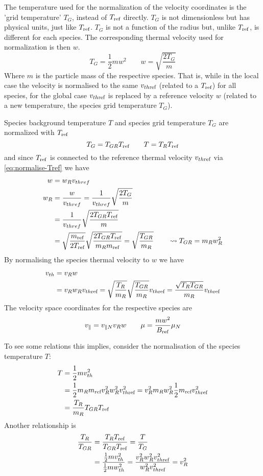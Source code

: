 The temperature used for the normalization of the velocity coordinates
is the 'grid temperature' $T_G$, instead of $T_{\text{ref}}$ directly. 
$T_G$ is not dimensionless but has physical units, just like $T_{\text{ref}}$. $T_G$ is
not a function of the radius but, unlike $T_{\rm ref}$, is different
for each species.  The corresponding thermal velocity used for normalization is then $w$.
\begin{equation}
T_G = \frac{1}{2} m w^2 \qquad w = \sqrt{\frac{2 T_G}{m} }
\end{equation}
Where $m$ is the particle mass of the respective species. 
That is, while in the local case the velocity is normalised to the same $v_{th\text{ref}}$ (related to a $T_{\text{ref}}$)
for all species, for the global case $v_{th\text{ref}}$ is replaced by a reference velocity $w$ (related to 
a new temperature, the species grid temperature $T_G$).

Species background temperature $T$ and species grid temperature $T_G$ are normalized with $T_{\rm ref}$
\begin{equation}
T_G = T_{GR} T_{\text{ref}} \qquad T = T_R T_{\text{ref}}
\end{equation}
and since $T_{\rm ref}$ is connected to the reference thermal velocity $v_{th\text{ref}}$ via \eqref{eq:normalise-Tref} we have 
\begin{align}
w &= w_R v_{thref} \\
w_R &= \frac{w}{v_{thref}} 
=\frac{1}{v_{thref}} \sqrt{\frac{2T_G}{m}}
\nonumber\\
&=\frac{1}{v_{thref}} \sqrt{\frac{2T_{GR}T_{\text{ref}}}{m}}
\\
&=\sqrt{\frac{ m_{\text{ref}}}{2T_{\text{ref}}} } \sqrt{\frac{2T_{GR}T_{\text{ref}}}{ m_Rm_{\text{ref}}} } 
= \sqrt{\frac{T_{GR}}{ m_R} } \qquad \leadsto T_{GR} = m_Rw_R^2
\end{align}
By normalising the species thermal velocity to $w$ we have
\begin{align}
  v_{th} &= v_R w\\
&= v_Rw_Rv_{th\text{ref}} 
= \sqrt{\frac{T_R}{m_R}}\sqrt{\frac{T_{GR}}{m_R}}v_{th\text{ref}}
= \frac{\sqrt{T_RT_{GR}}}{m_R}v_{th\text{ref}}
\end{align}
The velocity space coordinates for the respective species are
\begin{align}
v_\parallel = v_{\parallel N} v_R w  \qquad \mu = \frac{ mw^2}{B_{\rm ref}} \mu_N 
\end{align}

To see some relations this implies, consider the normalisation of the
species temperature $T$:
\begin{align}
  T &= \frac{1}{2}m v_{th}^2 \\
&= \frac{1}{2}m_Rm_{\text{ref}} v_R^2w_R^2v_{th\text{ref}}^2  
 = v_R^2 m_Rw_R^2 \frac{1}{2}m_{\text{ref}} v_{th\text{ref}}^2  
\\
 &= \frac{T_R}{m_R} T_{GR} T_{\text{ref}}
\end{align}
Another relationship is
\begin{align}
  \frac{T_R}{T_{GR}} &= \frac{T_RT_{\text{ref}}}{T_{GR}T_{\text{ref}}} = \frac{T}{T_G}
\\
&= \frac{\frac{1}{2}mv_{th}^2}{\frac{1}{2}mw_{th}^2}
= \frac{v_R^2w_R^2v_{th\text{ref}}^2}{w_R^2v_{th\text{ref}}^2}
= v_R^2
\label{eq:normalise-vR-Tratio}
\end{align}


